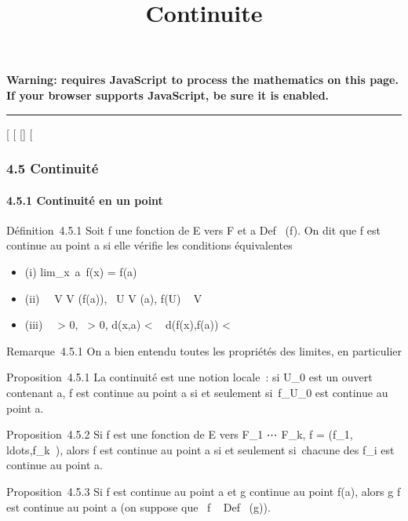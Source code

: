 \documentclass[]{article}
\title{Continuite}
\author{}
\date{}
\begin{document}
\maketitle

\textbf{Warning: 
requires JavaScript to process the mathematics on this page.\\ If your
browser supports JavaScript, be sure it is enabled.}

\begin{center}\rule{3in}{0.4pt}\end{center}

[
[
[]
[

\subsubsection{4.5 Continuité}

\paragraph{4.5.1 Continuité en un point}

Définition~4.5.1 Soit f une fonction de E vers F et a
\in Def~ (f). On dit que f est continue au point
a si elle vérifie les conditions équivalentes

\begin{itemize}
\itemsep1pt\parskip0pt
\item
  (i) lim_x\rightarrow~a~f(x) = f(a)
\item
  (ii) \forall~~V \in V (f(a)),
  \exists~U \in V (a), f(U) \subset~ V
\item
  (iii) \forall~~\epsilon > 0,
  \exists~\eta > 0, d(x,a) < \eta \rigtharrow~
  d(f(x),f(a)) < \epsilon
\end{itemize}

Remarque~4.5.1 On a bien entendu toutes les propriétés des limites, en
particulier

Proposition~4.5.1 La continuité est une notion locale~: si U_0
est un ouvert contenant a, f est continue au point a si et seulement
si~f_U_0 est continue au point a.

Proposition~4.5.2 Si f est une fonction de E vers F_1
\times⋯ \times F_k, f =
(f_1,\\ldots,f_k~),
alors f est continue au point a si et seulement si~chacune des
f_i est continue au point a.

Proposition~4.5.3 Si f est continue au point a et g continue au point
f(a), alors g \cdot f est continue au point a (on suppose que
\mathrmIm~f
\subset~ Def~ (g)).
\end{document}
